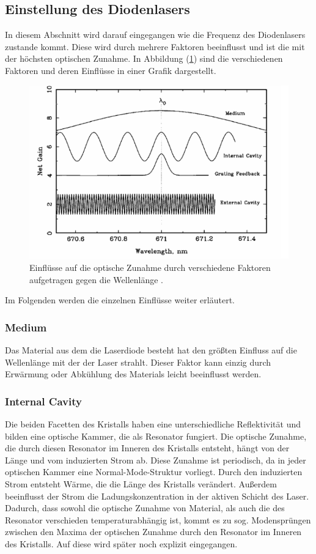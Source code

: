 \subsection{Einstellung des Diodenlasers}
In diesem Abschnitt wird darauf eingegangen wie die Frequenz des Diodenlasers zustande kommt. Diese wird durch mehrere Faktoren beeinflusst und ist die mit der höchsten optischen Zunahme. In Abbildung (\ref{fig:netga}) sind die verschiedenen Faktoren und deren Einflüsse in einer Grafik dargestellt.
\begin{figure}[h!]
  \centering
  \includegraphics[scale=0.7]{fig/netga.png}
  \caption{Einflüsse auf die optische Zunahme durch verschiedene Faktoren aufgetragen gegen die Wellenlänge \cite[6]{Anleitung}.}
  \label{fig:netga}
\end{figure}
\FloatBarrier
\noindent Im Folgenden werden die einzelnen Einflüsse weiter erläutert.
\subsubsection{Medium}
Das Material aus dem die Laserdiode besteht hat den größten Einfluss auf die Wellenlänge mit der der Laser strahlt. Dieser Faktor kann einzig durch Erwärmung oder Abkühlung des Materials leicht
beeinflusst werden.
\subsubsection{Internal Cavity}
Die beiden Facetten des Kristalls haben eine unterschiedliche Reflektivität und bilden eine optische Kammer, die als Resonator fungiert.
Die optische Zunahme, die durch diesen Resonator im Inneren des Kristalls entsteht, hängt von der Länge und vom induzierten Strom ab. Diese Zunahme ist periodisch, da in jeder optischen
Kammer eine Normal-Mode-Struktur vorliegt. Durch den induzierten Strom entsteht Wärme, die die Länge des Kristalls verändert. Außerdem beeinflusst der Strom die Ladungskonzentration in
der aktiven Schicht des Laser. Dadurch, dass sowohl die optische Zunahme von Material, als auch die des Resonator verschieden temperaturabhängig ist, kommt es zu sog. Modensprüngen zwischen
den Maxima der optischen Zunahme durch den Resonator im Inneren des Kristalls. Auf diese wird später noch explizit eingegangen.
